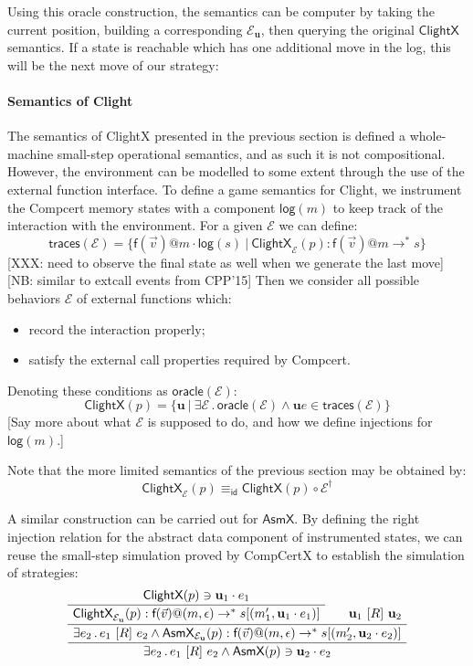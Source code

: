 \documentclass[acmsmall,anonymous]{acmart}
\makeatletter
\newcommand{\kw}[1]{\ensuremath{ \textsf{#1} }}
\newcommand{\ifr}[1]{\ [{#1}]\ }
\newcommand{\mcall}[3]{\kw{#1}({#2})@{#3}}
\makeatother
\begin{document}
Using this oracle construction,
the semantics can be computer by taking the current position,
building a corresponding $\mathcal{E}_\mathbf{u}$,
then querying the original $\kw{ClightX}$ semantics.
If a state is reachable which has one additional move in the log,
this will be the next move of our strategy:

\paragraph{Semantics of Clight}

The semantics of ClightX
presented in the previous section
is defined a whole-machine small-step operational semantics,
and as such it is not compositional.
However,
the environment can be modelled to some extent
through the use of the external function interface.
To define a game semantics for Clight,
we instrument the Compcert memory states
with a component $\kw{log}(m)$
to keep track of the interaction with the environment.
For a given $\mathcal{E}$ we can define:
\[
  \kw{traces}(\mathcal{E}) = \{
    \mcall{f}{\vec{v}}{m} \cdot \kw{log}(s) \ \vert\ 
    \kw{ClightX}_\mathcal{E}(p) :
      \mcall{f}{\vec{v}}{m} \rightarrow^* s
  \}
\]
[XXX: need to observe the final state as well
when we generate the last move]
[NB: similar to extcall events from CPP'15]
Then we consider
all possible behaviors $\mathcal{E}$ of external functions which:
\begin{itemize}
\item record the interaction properly;
\item satisfy the external call properties required by Compcert.
\end{itemize}
Denoting these conditions as $\kw{oracle}(\mathcal{E})$:
\[
  \kw{ClightX}(p) = \{
    \mathbf{u} \ \vert\ 
    \exists \mathcal{E} \,.\,
      \kw{oracle}(\mathcal{E}) \wedge
      \mathbf{u} e \in \kw{traces}(\mathcal{E})
  \}
\]
[Say more about what $\mathcal{E}$ is supposed to do,
and how we define injections for $\kw{log}(m)$.]

Note that the more limited semantics of the previous section
may be obtained by:
\[ \kw{ClightX}_\mathcal{E}(p) \equiv_\kw{id} \kw{ClightX}(p) \circ \mathcal{E}^\dagger \]

A similar construction can be carried out for $\kw{AsmX}$.
By defining the right injection relation
for the abstract data component of instrumented states,
we can reuse the small-step simulation proved by CompCertX
to establish the simulation of strategies:
\[
  \AxiomC{$\kw{ClightX}(p) \ni \mathbf{u}_1 \cdot e_1$}
  \UnaryInfC{$\kw{ClightX}_{\mathcal{E}_\mathbf{u}}(p) :
    \mcall{f}{\vec{v}}{(m, \epsilon)} \rightarrow^* s[(m_1', \mathbf{u}_1 \cdot e_1)]$}
  \AxiomC{$\mathbf{u}_1 \ifr{R} \mathbf{u}_2$}
  \BinaryInfC{$\exists e_2 \,.\, e_1 \ifr{R} e_2 \wedge
    \kw{AsmX}_{\mathcal{E}_\mathbf{u}}(p) :
      \mcall{f}{\vec{v}}{(m, \epsilon)} \rightarrow^*
      s[(m_2', \mathbf{u}_2 \cdot e_2)]$}
  \UnaryInfC{$\exists e_2 \,.\, e_1 \ifr{R} e_2 \wedge
    \kw{AsmX}(p) \ni \mathbf{u}_2 \cdot e_2$}
  \DisplayProof
\]
\end{document}
